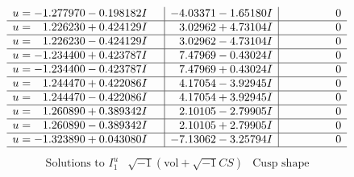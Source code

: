 \documentclass[1p]{elsarticle_modified}
\theoremstyle{definition}
\newcommand{\I}{\sqrt{-1}}
\begin{document}
$$\begin{array}{c|c|c}
\begin{aligned}
u &= -1.277970 - 0.198182 I\end{aligned}
 & -4.03371 - 1.65180 I & \phantom{-0.000000 } 0 \\ \hline\begin{aligned}
u &= \phantom{-}1.226230 + 0.424129 I\end{aligned}
 & \phantom{-}3.02962 + 4.73104 I & \phantom{-0.000000 } 0 \\ \hline\begin{aligned}
u &= \phantom{-}1.226230 - 0.424129 I\end{aligned}
 & \phantom{-}3.02962 - 4.73104 I & \phantom{-0.000000 } 0 \\ \hline\begin{aligned}
u &= -1.234400 + 0.423787 I\end{aligned}
 & \phantom{-}7.47969 - 0.43024 I & \phantom{-0.000000 } 0 \\ \hline\begin{aligned}
u &= -1.234400 - 0.423787 I\end{aligned}
 & \phantom{-}7.47969 + 0.43024 I & \phantom{-0.000000 } 0 \\ \hline\begin{aligned}
u &= \phantom{-}1.244470 + 0.422086 I\end{aligned}
 & \phantom{-}4.17054 - 3.92945 I & \phantom{-0.000000 } 0 \\ \hline\begin{aligned}
u &= \phantom{-}1.244470 - 0.422086 I\end{aligned}
 & \phantom{-}4.17054 + 3.92945 I & \phantom{-0.000000 } 0 \\ \hline\begin{aligned}
u &= \phantom{-}1.260890 + 0.389342 I\end{aligned}
 & \phantom{-}2.10105 - 2.79905 I & \phantom{-0.000000 } 0 \\ \hline\begin{aligned}
u &= \phantom{-}1.260890 - 0.389342 I\end{aligned}
 & \phantom{-}2.10105 + 2.79905 I & \phantom{-0.000000 } 0 \\ \hline\begin{aligned}
u &= -1.323890 + 0.043080 I\end{aligned}
 & -7.13062 - 3.25794 I & \phantom{-0.000000 } 0\\
 \hline 
 \end{array}$$\newpage$$\begin{array}{c|c|c}  
\text{Solutions to }I^u_{1}& \I (\text{vol} + \sqrt{-1}CS) & \text{Cusp shape}\\

\end{array}$$
\end{document}

